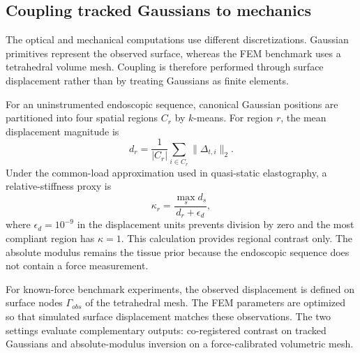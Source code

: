 \documentclass[smallextended]{svjour3}
\begin{document}
\subsection{Coupling tracked Gaussians to mechanics}
\label{sec:coupling}
The optical and mechanical computations use different discretizations.
Gaussian primitives represent the observed surface, whereas the FEM
benchmark uses a tetrahedral volume mesh. Coupling is therefore performed
through surface displacement rather than by treating Gaussians as finite
elements.

For an uninstrumented endoscopic sequence, canonical Gaussian positions
are partitioned into four spatial regions $C_r$ by $k$-means. For region $r$,
the mean displacement magnitude is
\begin{equation}
d_r = \frac{1}{|C_r|}\sum_{i\in C_r}\|\Delta_{t,i}\|_2 .
\label{eq:relative_displacement}
\end{equation}
Under the common-load approximation used in quasi-static elastography, a
relative-stiffness proxy is
\begin{equation}
\kappa_r = \frac{\max_s d_s}{d_r+\epsilon_d},
\label{eq:relative_stiffness}
\end{equation}
where $\epsilon_d=10^{-9}$ in the displacement units prevents division by
zero and the most compliant region has $\kappa=1$. This calculation
provides regional contrast only. The
absolute modulus remains the tissue prior because the endoscopic sequence
does not contain a force measurement.

For known-force benchmark experiments, the observed displacement is
defined on surface nodes $\Gamma_{obs}$ of the tetrahedral mesh. The FEM
parameters are optimized so that simulated surface displacement matches
these observations. The two settings evaluate complementary outputs:
co-registered contrast on tracked Gaussians and absolute-modulus inversion
on a force-calibrated volumetric mesh.
\end{document}
